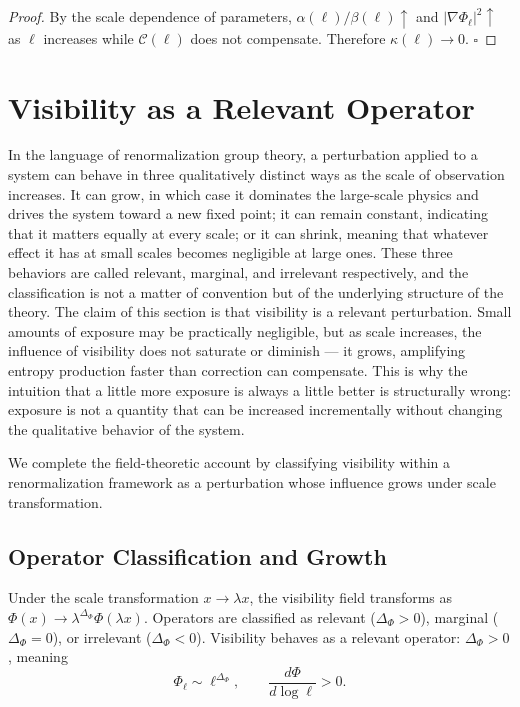 \documentclass[12pt,a4paper]{article}
\begin{document}
\begin{proof}
By the scale dependence of parameters, $\alpha(\ell)/\beta(\ell) \uparrow$ and $|\nabla\Phi_\ell|^2 \uparrow$ as $\ell$ increases while $\mathcal{C}(\ell)$ does not compensate. Therefore $\kappa(\ell) \to 0$. \hfill$\square$
\end{proof}

\section{Visibility as a Relevant Operator}

In the language of renormalization group theory, a perturbation applied to a system can behave in three qualitatively distinct ways as the scale of observation increases. It can grow, in which case it dominates the large-scale physics and drives the system toward a new fixed point; it can remain constant, indicating that it matters equally at every scale; or it can shrink, meaning that whatever effect it has at small scales becomes negligible at large ones. These three behaviors are called relevant, marginal, and irrelevant respectively, and the classification is not a matter of convention but of the underlying structure of the theory. The claim of this section is that visibility is a relevant perturbation. Small amounts of exposure may be practically negligible, but as scale increases, the influence of visibility does not saturate or diminish — it grows, amplifying entropy production faster than correction can compensate. This is why the intuition that a little more exposure is always a little better is structurally wrong: exposure is not a quantity that can be increased incrementally without changing the qualitative behavior of the system.

We complete the field-theoretic account by classifying visibility within a renormalization framework as a perturbation whose influence grows under scale transformation.

\subsection{Operator Classification and Growth}

Under the scale transformation $x \to \lambda x$, the visibility field transforms as $\Phi(x) \to \lambda^{\Delta_\Phi}\Phi(\lambda x)$. Operators are classified as relevant ($\Delta_\Phi > 0$), marginal ($\Delta_\Phi = 0$), or irrelevant ($\Delta_\Phi < 0$). Visibility behaves as a relevant operator: $\Delta_\Phi > 0$, meaning
\[
\Phi_\ell \sim \ell^{\Delta_\Phi}, \qquad \frac{d\Phi}{d\log\ell} > 0.
\]
\end{document}
